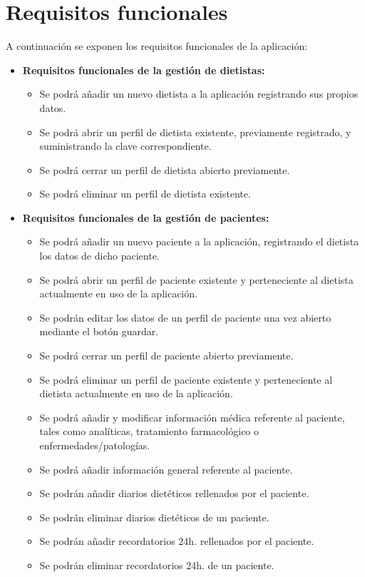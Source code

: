 \section{Requisitos funcionales}
A continuación se exponen los requisitos funcionales de la aplicación:
\begin{itemize}
\item \textbf{Requisitos funcionales de la gestión de dietistas:}
\begin{itemize}
\item Se podrá añadir un nuevo dietista a la aplicación registrando sus propios datos.
\item Se podrá abrir un perfil de dietista existente, previamente registrado, y suministrando la clave correspondiente.
\item Se podrá cerrar un perfil de dietista abierto previamente.
\item Se podrá eliminar un perfil de dietista existente.
\end{itemize}
\item \textbf{Requisitos funcionales de la gestión de pacientes:}
\begin{itemize}
\item Se podrá añadir un nuevo paciente a la aplicación, registrando el dietista los datos de dicho paciente.
\item Se podrá abrir un perfil de paciente existente y perteneciente al dietista actualmente en uso de la aplicación.
\item Se podrán editar los datos de un perfil de paciente una vez abierto mediante el botón guardar.
\item Se podrá cerrar un perfil de paciente abierto previamente.
\item Se podrá eliminar un perfil de paciente existente y perteneciente al dietista actualmente en uso de la aplicación.
\item Se podrá añadir y modificar información médica referente al paciente, tales como analíticas, tratamiento farmacológico o enfermedades/patologías.
\item Se podrá añadir información general referente al paciente.
\item Se podrán añadir diarios dietéticos rellenados por el paciente.
\item Se podrán eliminar diarios dietéticos de un paciente.
\item Se podrán añadir recordatorios 24h. rellenados por el paciente.
\item Se podrán eliminar recordatorios 24h. de un paciente.

\end{itemize}
\end{itemize}
